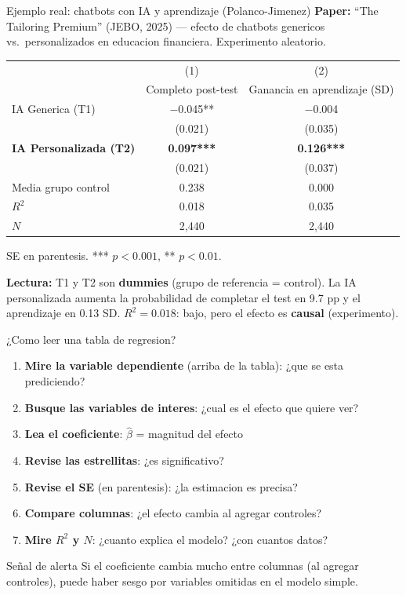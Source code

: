 \documentclass[aspectratio=169, 11pt]{beamer}
\begin{document}
\begin{frame}{Ejemplo real: chatbots con IA y aprendizaje (Polanco-Jimenez)}
\small
\textbf{Paper:} ``The Tailoring Premium'' (JEBO, 2025) --- efecto de chatbots genericos vs.\ personalizados en educacion financiera. Experimento aleatorio.

\vspace{0.1cm}
\begin{center}
\scriptsize
\begin{tabular}{lcc}
\toprule
& (1) & (2) \\
& Completo post-test & Ganancia en aprendizaje (SD) \\
\midrule
IA Generica (T1) & $-$0.045** & $-$0.004 \\
& (0.021) & (0.035) \\[3pt]
\textbf{IA Personalizada (T2)} & \textbf{0.097***} & \textbf{0.126***} \\
& (0.021) & (0.037) \\[3pt]
Media grupo control & 0.238 & 0.000 \\
\midrule
$R^2$ & 0.018 & 0.035 \\
$N$ & 2{,}440 & 2{,}440 \\
\bottomrule
\end{tabular}
\end{center}
\footnotesize SE en parentesis. *** $p<0.001$, ** $p<0.01$.

\vspace{0.1cm}
\small \textbf{Lectura:} T1 y T2 son \textbf{dummies} (grupo de referencia = control). La IA personalizada aumenta la probabilidad de completar el test en 9.7 pp y el aprendizaje en 0.13 SD. $R^2 = 0.018$: bajo, pero el efecto es \textbf{causal} (experimento).
\end{frame}

\begin{frame}{¿Como leer una tabla de regresion?}
\small
\begin{enumerate}\setlength{\itemsep}{4pt}
  \item \textbf{Mire la variable dependiente} (arriba de la tabla): ¿que se esta prediciendo?
  \item \textbf{Busque las variables de interes}: ¿cual es el efecto que quiere ver?
  \item \textbf{Lea el coeficiente}: $\hat{\beta}$ = magnitud del efecto
  \item \textbf{Revise las estrellitas}: ¿es significativo?
  \item \textbf{Revise el SE} (en parentesis): ¿la estimacion es precisa?
  \item \textbf{Compare columnas}: ¿el efecto cambia al agregar controles?
  \item \textbf{Mire $R^2$ y $N$}: ¿cuanto explica el modelo? ¿con cuantos datos?
\end{enumerate}

\vspace{0.2cm}
\begin{alertblock}{Se\~nal de alerta}
\small Si el coeficiente cambia mucho entre columnas (al agregar controles), puede haber sesgo por variables omitidas en el modelo simple.
\end{alertblock}
\end{frame}
\end{document}
